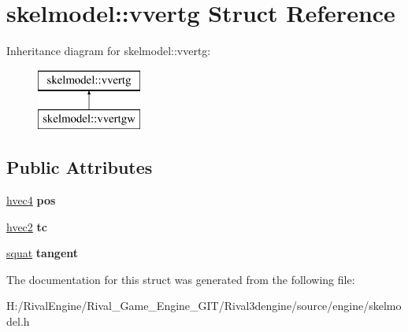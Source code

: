 \hypertarget{structskelmodel_1_1vvertg}{}\section{skelmodel\+:\+:vvertg Struct Reference}
\label{structskelmodel_1_1vvertg}
Inheritance diagram for skelmodel\+:\+:vvertg\+:\begin{figure}[H]
\begin{center}
\leavevmode
\includegraphics[height=2.000000cm]{structskelmodel_1_1vvertg}
\end{center}
\end{figure}
\subsection*{Public Attributes}
\begin{DoxyCompactItemize}
\item 
\mbox{\label{structskelmodel_1_1vvertg_a3c95437b29bd60d07fb5c0057a20dc98}} 
\hyperlink{structhvec4}{hvec4} {\bfseries pos}
\item 
\mbox{\label{structskelmodel_1_1vvertg_adeb690daacbcb8220f45baadaddcedf0}} 
\hyperlink{structhvec2}{hvec2} {\bfseries tc}
\item 
\mbox{\label{structskelmodel_1_1vvertg_a7fcc01314f1790e10f239d6e2ddae203}} 
\hyperlink{structsquat}{squat} {\bfseries tangent}
\end{DoxyCompactItemize}


The documentation for this struct was generated from the following file\+:\begin{DoxyCompactItemize}
\item 
H\+:/\+Rival\+Engine/\+Rival\+\_\+\+Game\+\_\+\+Engine\+\_\+\+G\+I\+T/\+Rival3dengine/source/engine/skelmodel.\+h\end{DoxyCompactItemize}
